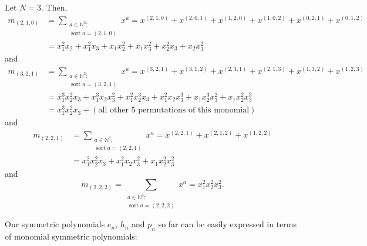 \begin{example}
Let $N=3$. Then,%
\begin{align*}
m_{\left(  2,1,0\right)  }  &  =\sum_{\substack{a\in\mathbb{N}^{3}%
;\\\operatorname*{sort}a=\left(  2,1,0\right)  }}x^{a}=x^{\left(
2,1,0\right)  }+x^{\left(  2,0,1\right)  }+x^{\left(  1,2,0\right)
}+x^{\left(  1,0,2\right)  }+x^{\left(  0,2,1\right)  }+x^{\left(
0,1,2\right)  }\\
&  =x_{1}^{2}x_{2}+x_{1}^{2}x_{3}+x_{1}x_{2}^{2}+x_{1}x_{3}^{2}+x_{2}^{2}%
x_{3}+x_{2}x_{3}^{2}%
\end{align*}
and%
\begin{align*}
m_{\left(  3,2,1\right)  }  &  =\sum_{\substack{a\in\mathbb{N}^{3}%
;\\\operatorname*{sort}a=\left(  3,2,1\right)  }}x^{a}=x^{\left(
3,2,1\right)  }+x^{\left(  3,1,2\right)  }+x^{\left(  2,3,1\right)
}+x^{\left(  2,1,3\right)  }+x^{\left(  1,3,2\right)  }+x^{\left(
1,2,3\right)  }\\
&  =x_{1}^{3}x_{2}^{2}x_{3}+x_{1}^{3}x_{2}x_{3}^{2}+x_{1}^{2}x_{2}^{3}%
x_{3}+x_{1}^{2}x_{2}x_{3}^{3}+x_{1}x_{2}^{3}x_{3}^{2}+x_{1}x_{2}^{2}x_{3}%
^{3}\\
&  =x_{1}^{3}x_{2}^{2}x_{3}+\left(  \text{all other }5\text{ permutations of
this monomial}\right)
\end{align*}
and%
\begin{align*}
m_{\left(  2,2,1\right)  }  &  =\sum_{\substack{a\in\mathbb{N}^{3}%
;\\\operatorname*{sort}a=\left(  2,2,1\right)  }}x^{a}=x^{\left(
2,2,1\right)  }+x^{\left(  2,1,2\right)  }+x^{\left(  1,2,2\right)  }\\
&  =x_{1}^{2}x_{2}^{2}x_{3}+x_{1}^{2}x_{2}x_{3}^{2}+x_{1}x_{2}^{2}x_{3}^{2}%
\end{align*}
and%
\[
m_{\left(  2,2,2\right)  }=\sum_{\substack{a\in\mathbb{N}^{3}%
;\\\operatorname*{sort}a=\left(  2,2,2\right)  }}x^{a}=x_{1}^{2}x_{2}^{2}%
x_{3}^{2}.
\]

\end{example}

Our symmetric polynomials $e_{n}$, $h_{n}$ and $p_{n}$ so far can be easily
expressed in terms of monomial symmetric polynomials:

